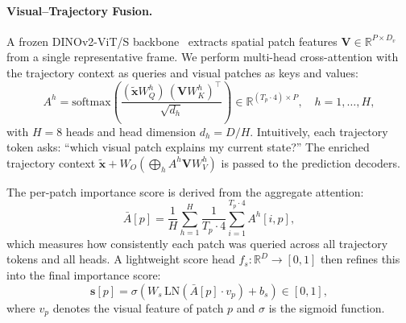 \paragraph{Visual--Trajectory Fusion.}
\label{sec:vtfusion}
A frozen DINOv2-ViT/S backbone~\cite{oquab2023dinov2} extracts spatial patch
features $\mathbf{V} \in \mathbb{R}^{P \times D_v}$ from a single representative frame.
We perform multi-head cross-attention with the trajectory context as queries and
visual patches as keys and values:
\begin{equation}
    A^h = \mathrm{softmax}\!\left(
        \frac{(\tilde{\mathbf{x}} W_Q^h)\,(\mathbf{V} W_K^h)^\top}{\sqrt{d_h}}
    \right) \in \mathbb{R}^{(T_p \cdot 4) \times P}, \quad h=1,\dots,H,
\end{equation}
with $H{=}8$ heads and head dimension $d_h = D/H$.
Intuitively, each trajectory token asks: ``which visual patch explains my current
state?''  The enriched trajectory context
$\tilde{\mathbf{x}} + W_O\!\left(\bigoplus_h A^h \mathbf{V} W_V^h\right)$
is passed to the prediction decoders.

The per-patch importance score is derived from the aggregate attention:
\begin{equation}
    \bar{A}[p] = \frac{1}{H} \sum_{h=1}^{H}
                  \frac{1}{T_p \cdot 4} \sum_{i=1}^{T_p \cdot 4} A^h[i, p],
\end{equation}
which measures how consistently each patch was queried across all trajectory
tokens and all heads.  A lightweight score head
$f_s : \mathbb{R}^D \to [0,1]$ then refines this into the final importance score:
\begin{equation}
    \mathbf{s}[p] = \sigma\!\left(
        W_s \,\mathrm{LN}\!\left(\bar{A}[p] \cdot v_p\right) + b_s
    \right) \in [0,1],
\end{equation}
where $v_p$ denotes the visual feature of patch $p$ and $\sigma$ is the sigmoid function.

